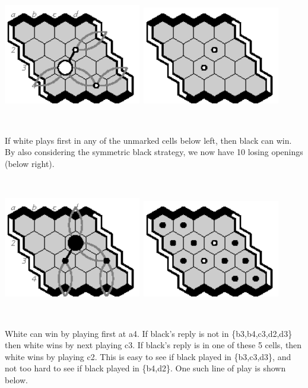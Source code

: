 \documentclass[12pt]{article}
\begin{document}
\includegraphics[width=60mm]{fz/pix/4.1strat2.eps}\
\includegraphics[width=60mm]{fz/pix/4x4.winners0.eps}

~

\newpage
If white plays first in any of the unmarked cells
below left, then black can win. By also considering the 
symmetric black strategy, we now have 10 losing openings (below right).

~

\includegraphics[width=60mm]{fz/pix/4.1strat.eps}\
\includegraphics[width=60mm]{fz/pix/4x4.winners1.eps}

~

White can win by playing first at a4.
If black's reply is not in \{b3,b4,c3,d2,d3\}
then white wins by next playing c3.
If black's reply is in one of these 5 cells,
then white wins by playing c2.
This is easy to see if black played in \{b3,c3,d3\},
and not too hard to see if black played in \{b4,d2\}.
One such line of play is shown below.
\end{document}
